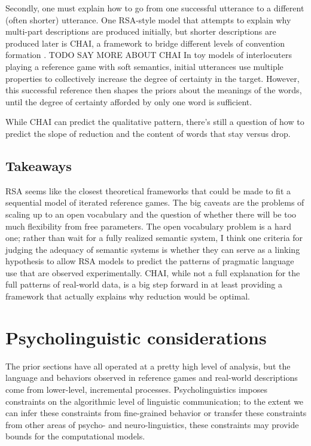 \documentclass[]{article}
\begin{document}
Secondly, one must explain how to go from one successful utterance to a different (often shorter) utterance. One RSA-style model that attempts to explain why multi-part descriptions are produced initially, but shorter descriptions are produced later is CHAI,  a framework to bridge different levels of convention formation \cite{hawkins2021}. TODO SAY MORE ABOUT CHAI In toy models of interlocuters playing a reference game with soft semantics, initial utterances use multiple properties to collectively increase the degree of certainty in the target. However, this successful reference then shapes the priors about the meanings of the words, until the degree of certainty afforded by only one word is sufficient. 

While CHAI can predict the qualitative pattern, there's still a question of how to predict the slope of reduction and the content of words that stay versus drop. 


\subsection{Takeaways}
RSA seems like the closest theoretical frameworks that could be made to fit a sequential model of iterated reference games. The big caveats are the problems of scaling up to an open vocabulary and the question of whether there will be too much flexibility from free parameters. The open vocabulary problem is a hard one; rather than wait for a fully realized semantic system, I think one criteria for judging the adequacy of semantic systems is whether they can serve as a linking hypothesis to allow RSA models to predict the patterns of pragmatic language use that are observed experimentally. 
CHAI, while not a full explanation for the full patterns of real-world data, is a big step forward in at least providing a framework that actually explains why reduction would be optimal. 

\section{Psycholinguistic considerations}

The prior sections have all operated at a pretty high level of analysis, but the language and behaviors observed in reference games and real-world descriptions come from lower-level, incremental processes. Psycholinguistics imposes constraints on the algorithmic level of linguistic communication; to the extent we can infer these constraints from fine-grained behavior or transfer these constraints from other areas of psycho- and neuro-linguistics, these constraints may provide bounds for the computational models. 
\end{document}
